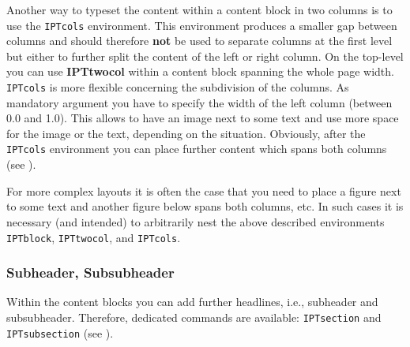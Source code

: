 

Another way to typeset the content within a content block in two columns is to use the \texttt{IPTcols} environment. This environment produces a smaller gap between columns and should therefore \textbf{not} be used to separate columns at the first level but either to further split the content of the left or right column. On the top-level you can use \textbf{IPTtwocol} within a content block spanning the whole page width. \texttt{IPTcols} is more flexible concerning the subdivision of the columns. As mandatory argument you have to specify the width of the left column (between 0.0 and 1.0). This allows to have an image next to some text and use more space for the image or the text, depending on the situation. Obviously, after the \texttt{IPTcols} environment you can place further content which spans both columns (see ). 


For more complex layouts it is often the case that you need to place a figure next to some text and another figure below spans both columns, etc. In such cases it is necessary (and intended) to arbitrarily nest the above described environments \texttt{IPTblock}, \texttt{IPTtwocol}, and \texttt{IPTcols}.


\subsubsection{Subheader, Subsubheader} %
\label{ssub:subheader_subsubheader}

Within the content blocks you can add further headlines, i.e., subheader and subsubheader. Therefore, dedicated commands are available: \texttt{\bs{}IPTsection} and \texttt{\bs{}IPTsubsection} (see ).


